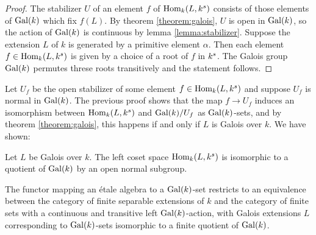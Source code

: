 \begin{proof}
	The stabilizer $U$ of an element $f$ of $\operatorname{Hom}_k(L, k^s)$ consists of those elements of $\operatorname{Gal}(k)$ which fix $f(L)$. By theorem \ref{theorem:galois}, $U$ is open in $\operatorname{Gal}(k)$, so the action of $\operatorname{Gal}(k)$ is continuous by lemma \ref{lemma:stabilizer}. Suppose the extension $L$ of $k$ is generated by a primitive element $\alpha$. Then each element $f \in \operatorname{Hom}_k(L, k^s)$ is given by a choice of a root of $f$ in $k^s$. The Galois group $\operatorname{Gal}(k)$ permutes threse roots transitively and the statement follows.
\end{proof}

Let $U_f$ be the open stabilizer of some element $f \in \operatorname{Hom}_k(L, k^s)$ and suppose $U_f$ is normal in $\operatorname{Gal}(k)$. The previous proof shows that the map $f \to U_f$ induces an isomorphism between $\operatorname{Hom}_k(L, k^s)$ and $\operatorname{Gal}(k)/U_f$ as $\operatorname{Gal}(k)$-sets, and by theorem \ref{theorem:galois}, this happens if and only if $L$ is Galois over $k$. We have shown:

\begin{theorem}
	Let $L$ be Galois over $k$. The left coset space $\operatorname{Hom}_k(L, k^s)$ is isomorphic to a quotient of $\operatorname{Gal}(k)$ by an open normal subgroup.
\end{theorem}

\begin{theorem}
	The functor mapping an \'etale algebra to a $\operatorname{Gal}(k)$-set restricts to an equivalence between the category of finite separable extensions of $k$ and the category of finite sets with a continuous and transitive left $\operatorname{Gal}(k)$-action, with Galois extensions $L$ corresponding to $\operatorname{Gal}(k)$-sets isomorphic to a finite quotient of $\operatorname{Gal}(k)$.
\end{theorem}

